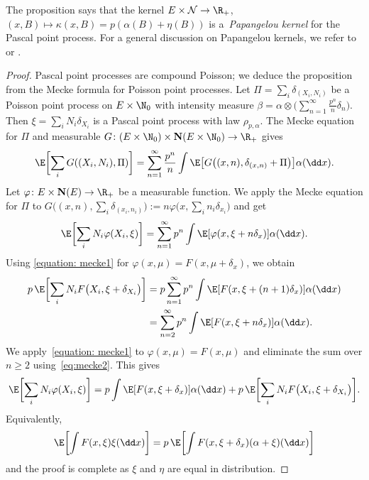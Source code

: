 The proposition says that the kernel $E\times \mathcal N\to \R_+$, $(x,B)\mapsto \kappa(x,B) = p(\alpha(B) + \eta(B))$ is a~\emph{Papangelou kernel} for the Pascal point process. For a general discussion on Papangelou kernels, we refer to \cite{MatthesWarmuthMecke} or \cite[Section 1.2.2]{Rafler2009}.

\begin{proof}
	Pascal point processes are compound Poisson; we deduce the proposition from the Mecke formula for Poisson point processes. Let $\Pi = \sum_i \delta_{(X_i,N_i)}$ be a Poisson point process on $E\times \N_0$ with intensity measure $\beta = \alpha\otimes \bigl(\sum_{n=1}^\infty \frac{p^n}{n} \delta_n\bigr)$. Then $\xi = \sum_i N_i \delta_{X_i}$ is a Pascal point process with law $\rho_{p,\alpha}$. The Mecke equation for $\Pi$ \cite[Theorem 4.1]{LastPenroseLecturesOnThePoissonProcess} and measurable $G\colon (E\times \N_0)\times \mathbf N(E\times \N_0) \to \R_+$ gives
\[
	\E\biggl[ \sum_i G( (X_i, N_i), \Pi )\biggr] = \sum_{n=1}^\infty \frac{p^n}{n} \int \E\bigl[ G\bigl( (x,n), \delta_{(x,n)} + \Pi\bigr) \bigr] \alpha (\dd x).
\]
Let $\varphi\colon E\times \mathbf N(E)\to \R_+$ be a measurable function. We apply the Mecke equation for $\Pi$ to $G\bigl((x,n),\sum_i \delta_{(x_i,n_i)}\bigr):= n \varphi\bigl(x, \sum_i n_i \delta_{x_i}\bigr)$ and get
\begin{equation}
 \label{equation: mecke1}
	\E\biggl[\sum_i N_i \varphi( X_i, \xi)\biggr] = \sum_{n=1}^\infty p^n \int \E[ \varphi(x, \xi+ n \delta_x)] \alpha(\dd x).
\end{equation}
Using \eqref{equation: mecke1} for $\varphi(x,\mu) = F(x,\mu + \delta_x)$, we obtain
\begin{align}
 p\, \E \biggl[ \sum_i N_i F\bigl( X_i, \xi +\delta_{X_i}\bigr)\biggr] &= p\sum_{n=1}^\infty p^n \int \E [ F(x, \xi + (n+1) \delta_{x}) ]\alpha(\dd x) \notag \\
 &= \sum_{n=2}^\infty p^n \int \E [ F(x, \xi + n \delta_{x}) ] \alpha(\dd x). \label{eq:mecke2}
\end{align}
We apply~\eqref{equation: mecke1} to $\varphi(x,\mu) = F(x,\mu)$ and eliminate the sum over $n\geq 2$ using~\eqref{eq:mecke2}. This gives
\begin{equation*}
	\E\biggl[\sum_i N_i \varphi( X_i, \xi)\biggr] =
		p \int \E[ F(x, \xi+ \delta_x)] \alpha(\dd x) + p\, \E \biggl[ \sum_i N_i F\bigl( X_i, \xi +\delta_{X_i}\bigr)\biggr].
\end{equation*}
Equivalently,
\[
	\E\biggl[ \int F(x,\xi) \xi(\dd x)\biggr] = p\, \E\biggl[ \int F(x, \xi+\delta_x) (\alpha + \xi)(\dd x)\biggr]
\]
and the proof is complete as $\xi$ and $\eta$ are equal in distribution.
\end{proof}

